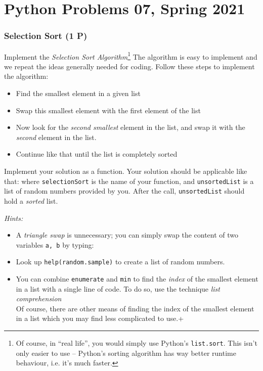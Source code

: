 \documentclass[
	english,
	fontsize=10pt,
	parskip=half,
	titlepage=true,
	DIV=12
]{scrartcl}
\newcommand*{\inPy}[1]{\texttt{#1}}
\newcommand*{\ie}{i.\;e. }
\begin{document}
\part*{Python Problems 07, Spring 2021}
\section{Selection Sort (1 P)}
Implement the \emph{Selection Sort Algorithm}\footnote{Of course, in \enquote{real life}, you would simply use Python's \inPy{list.sort}. This isn't only easier to use -- Python's sorting algorithm has way better runtime behaviour, \ie it's much faster.}
The algorithm is easy to implement and we repeat the ideas generally needed for coding. Follow these steps to implement the algorithm:
\begin{itemize}
\item Find the smallest element in a given list
\item Swap this smallest element with the first element of the list
\item Now look for the \emph{second smallest} element in the list, and swap it with the \emph{second} element in the list.
\item Continue like that until the list is completely sorted
\end{itemize}

Implement your solution as a function. Your solution should be applicable like that:
where \texttt{selectionSort} is the name of your function, and \texttt{unsortedList} is a list of random numbers provided by you. After the call, \texttt{unsortedList} should hold a \emph{sorted} list.

\emph{Hints:}\\
\begin{itemize}
\item A \emph{triangle swap} is unnecessary; you can simply swap the content of two variables \texttt{a, b} by typing:
\item Look up \texttt{help(random.sample)} to create a list of random numbers.
\item You can combine \inPy{enumerate} and \inPy{min} to find the \emph{index} of the smallest element in a list with a single line of code. To do so, use the
	technique \emph{list comprehension}\\
	Of course, there are other means of finding the index of the smallest element in a list which you may find less complicated to use.+
\end{itemize}
\end{document}

